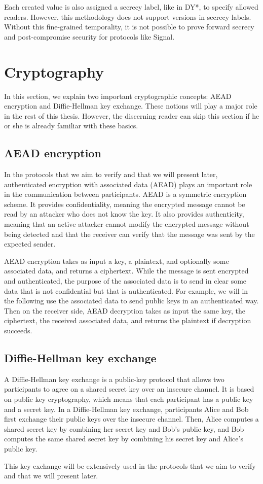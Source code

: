 Each created value is also assigned a secrecy label, like in DY*, to specify allowed readers.
However, this methodology does not support versions in secrecy labels.
Without this fine-grained temporality, it is not possible to prove forward secrecy and post-compromise security for protocols like Signal.

\section{Cryptography}
In this section, we explain two important cryptographic concepts: AEAD encryption and Diffie-Hellman key exchange.
These notions will play a major role in the rest of this thesis. 
However, the discerning reader can skip this section if he or she is already familiar with these basics.

\subsection{AEAD encryption}
In the protocols that we aim to verify and that we will present later, authenticated encryption with associated data (AEAD) plays an important role in the communication between participants.
AEAD is a symmetric encryption scheme.
It provides confidentiality, meaning the encrypted message cannot be read by an attacker who does not know the key.
It also provides authenticity, meaning that an active attacker cannot modify the encrypted message without being detected and that the receiver can verify that the message was sent by the expected sender.

AEAD encryption takes as input a key, a plaintext, and optionally some associated data, and returns a ciphertext.
While the message is sent encrypted and authenticated, the purpose of the associated data is to send in clear some data that is not confidential but that is authenticated.
For example, we will in the following use the associated data to send public keys in an authenticated way.
Then on the receiver side, AEAD decryption takes as input the same key, the ciphertext, the received associated data, and returns the plaintext if decryption succeeds.

\subsection{Diffie-Hellman key exchange}

A Diffie-Hellman key exchange is a public-key protocol that allows two participants to agree on a shared secret key over an insecure channel.
It is based on public key cryptography, which means that each participant has a public key and a secret key.
In a Diffie-Hellman key exchange, participants Alice and Bob first exchange their public keys over the insecure channel.
Then, Alice computes a shared secret key by combining her secret key and Bob's public key, and Bob computes the same shared secret key by combining his secret key and Alice's public key.

This key exchange will be extensively used in the protocols that we aim to verify and that we will present later.